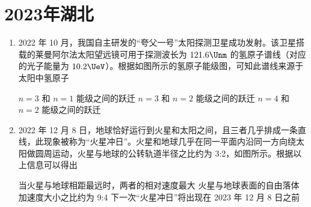 \documentclass[\gkver]{gaokaozhenti}
\begin{document}
\chapter{2023年湖北}

\begin{enumerate}
\item
2022 年 10 月，我国自主研发的“夸父一号”太阳探测卫星成功发射。该卫星搭载的莱曼阿尔法太阳望远镜可用于探测波长为 $121.6\Unm$ 的氢原子谱线（对应的光子能量为 $10.2\UeV$）。根据如图所示的氢原子能级图，可知此谱线来源于太阳中氢原子 


{$n=3$ 和 $n=1$ 能级之间的跃迁}
{$n=3$ 和 $n=2$ 能级之间的跃迁}
{$n=4$ 和 $n=2$ 能级之间的跃迁}


\item
2022 年 12 月 8 日，地球恰好运行到火星和太阳之间，且三者几乎排成一条直线，此现象被称为“火星冲日”。火星和地球几乎在同一平面内沿同一方向绕太阳做圆周运动，火星与地球的公转轨道半径之比约为 3:2，如图所示。根据以上信息可以得出 


{当火星与地球相距最远时，两者的相对速度最大}
{火星与地球表面的自由落体加速度大小之比约为 9:4}
{下一次“火星冲日”将出现在 2023 年 12 月 8 日之前}

\end{enumerate}
\end{document}
